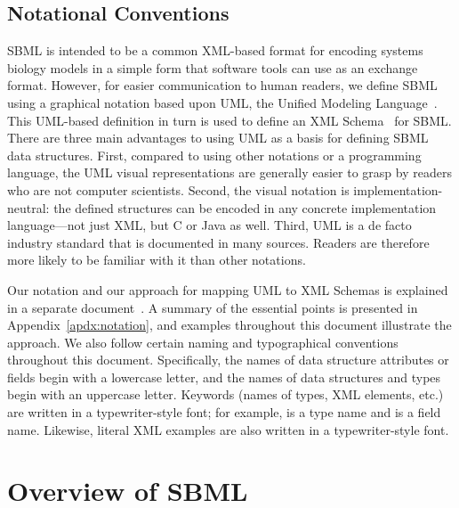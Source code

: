 \documentclass[10pt]{cekarticle}
\begin{document}
\subsection{Notational Conventions}

SBML is intended to be a common XML-based format for encoding systems
biology models in a simple form that software tools can use as an exchange
format.  However, for easier communication to human readers, we define SBML
using a graphical notation based upon UML, the Unified Modeling
Language~\citep{eriksson:1998,oestereich:1999}.  This UML-based definition
in turn is used to define an XML
Schema~\citep{biron:2000,fallside:2000,thompson:2000} for SBML.  There are
three main advantages to using UML as a basis for defining SBML data
structures.  First, compared to using other notations or a programming
language, the UML visual representations are generally easier to grasp by
readers who are not computer scientists.  Second, the visual notation is
implementation-neutral: the defined structures can be encoded in any
concrete implementation language---not just XML, but C or Java as well.
Third, UML is a de facto industry standard that is documented in many
sources.  Readers are therefore more likely to be familiar with it than
other notations.

Our notation and our approach for mapping UML to XML Schemas is explained
in a separate document~\citep{hucka:2000b}.  A summary of the essential
points is presented in Appendix~\ref{apdx:notation}, and examples
throughout this document illustrate the approach.  We also follow certain
naming and typographical conventions throughout this document.
Specifically, the names of data structure attributes or fields begin with a
lowercase letter, and the names of data structures and types begin with an
uppercase letter.  Keywords (names of types, XML elements, etc.) are
written in a typewriter-style font; for example,  is a
type name and  is a field name.  Likewise, literal XML
examples are also written in a typewriter-style font.


\section{Overview of SBML}
\label{sec:overview}
\end{document}
